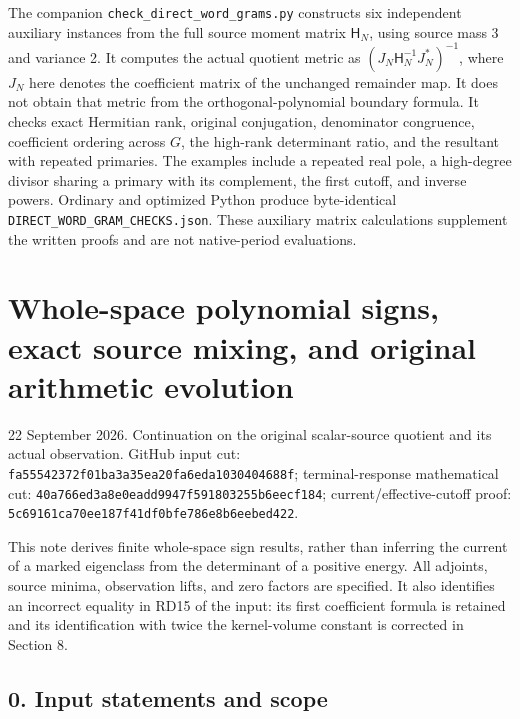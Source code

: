 \documentclass[11pt]{article}
\begin{document}
The companion \texttt{check\_\allowbreak{}direct\_\allowbreak{}word\_\allowbreak{}grams.py} constructs six independent auxiliary instances from the full source moment matrix \(\mathsf H_N\), using source mass 3 and variance 2. It computes the actual quotient metric as \((J_N\mathsf H_N^{-1}J_N^*)^{-1}\), where \(J_N\) here denotes the coefficient matrix of the unchanged remainder map. It does not obtain that metric from the orthogonal-polynomial boundary formula. It checks exact Hermitian rank, original conjugation, denominator congruence, coefficient ordering across \(G\), the high-rank determinant ratio, and the resultant with repeated primaries. The examples include a repeated real pole, a high-degree divisor sharing a primary with its complement, the first cutoff, and inverse powers. Ordinary and optimized Python produce byte-identical \texttt{DIRECT\_\allowbreak{}WORD\_\allowbreak{}GRAM\_\allowbreak{}CHECKS.json}. These auxiliary matrix calculations supplement the written proofs and are not native-period evaluations.

\clearpage
\section{Whole-space polynomial signs, exact source mixing, and original arithmetic evolution}\label{part3-whole-space-polynomial-signs-exact-source-mixing-and-original-arithmetic-evolution}

22 September 2026. Continuation on the original scalar-source quotient and its actual observation. GitHub input cut: \texttt{fa55542372f01ba3a35ea20fa6eda1030404688f}; terminal-response mathematical cut: \texttt{40a766ed3a8e0eadd9947f591803255b6eecf184}; current/effective-cutoff proof: \texttt{5c69161ca70ee187f41df0bfe786e8b6eebed422}.

This note derives finite whole-space sign results, rather than inferring the current of a marked eigenclass from the determinant of a positive energy. All adjoints, source minima, observation lifts, and zero factors are specified. It also identifies an incorrect equality in RD15 of the input: its first coefficient formula is retained and its identification with twice the kernel-volume constant is corrected in Section 8.

\subsection{0. Input statements and scope}\label{part3-input-statements-and-scope}
\end{document}
